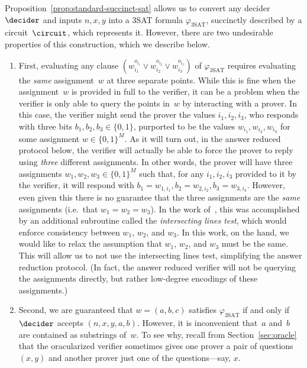 Proposition~\ref{prop:standard-succinct-sat} allows us to convert any decider
$\decider$ and inputs $n, x, y$ into a 3SAT formula $\varphi_{\mathrm{3SAT}}$,
succinctly described by a circuit~$\circuit$, which represents it.
However, there are two undesirable properties of this construction, which we
describe below.
\begin{enumerate}
\item First, evaluating any clause $(w_{i_1}^{o_{i_1}} \lor
  w_{i_2}^{o_{i_2}}\lor w_{i_3}^{o_{i_3}})$ of $\varphi_{\mathrm{3SAT}}$
  requires evaluating the \emph{same} assignment~$w$ at three separate points.
	While this is fine when the assignment~$w$ is provided in full to the
  verifier, it can be a problem when the verifier is only able to query the
  points in~$w$ by interacting with a prover.
	In this case, the verifier might send the prover the values $i_1, i_2, i_3$,
  who responds with three bits $b_1, b_2, b_3 \in \{0, 1\}$, purported to be the
  values $w_{i_1}, w_{i_2}, w_{i_3}$ for some assignment $w \in \{0, 1\}^M$.
	As it will turn out, in the answer reduced protocol below, the verifier will
  actually be able to force the prover to reply using \emph{three} different
  assignments.
	In other words, the prover will have three assignments $w_1, w_2, w_3 \in \{0,
  1\}^M$ such that, for any $i_1, i_2, i_3$ provided to it by the verifier, it
  will respond with $b_1 = w_{1, i_1}, b_2 = w_{2, i_2}, b_3 = w_{3, i_3}$.
	However, even given this there is no guarantee that the three assignments are
  the \emph{same} assignments (i.e.\ that $w_1 = w_2 = w_3$).
	In the work of~\cite{NW19}, this was accomplished by an additional subroutine
  called the \emph{intersecting lines test}, which would enforce consistency
  between $w_1$, $w_2$, and $w_3$.
	In this work, on the hand, we would like to relax the assumption that $w_1$,
  $w_2$, and $w_3$ must be the same.
	This will allow us to not use the intersecting lines test, simplifying the
  answer reduction protocol.
	(In fact, the answer reduced verifier will not be querying the assignments
  directly, but rather low-degree encodings of these assignments.)
\item Second, we are guaranteed that $w = (a, b, c)$ satisfies
  $\varphi_{\mathrm{3SAT}}$ if and only if $\decider$ accepts $(n, x, y, a, b)$.
	However, it is inconvenient that~$a$ and~$b$ are contained as substrings
  of~$w$.
	To see why, recall from Section~\ref{sec:oracle} that the oracularized
  verifier sometimes gives one prover a pair of questions $(x, y)$ and another
  prover just one of the questions---say, $x$.

\end{enumerate}

